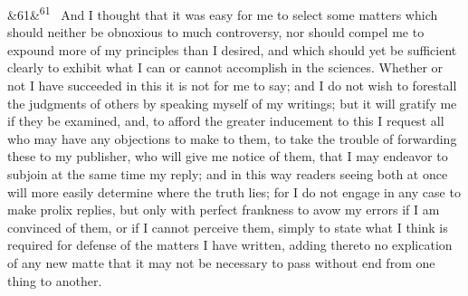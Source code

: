 \documentclass[12pt]{article}
\newcommand{\para}[1][]{\par\noindent\ifx&#1&\else\textsuperscript{\footnotesize #1}~\fi}
\begin{document}
\para[61] And I thought that it was easy for me to select some matters which should neither be obnoxious to much controversy, nor should compel me to expound more of my principles than I desired, and which should yet be sufficient clearly to exhibit what I can or cannot accomplish in the sciences. Whether or not I have succeeded in this it is not for me to say; and I do not wish to forestall the judgments of others by speaking myself of my writings; but it will gratify me if they be examined, and, to afford the greater inducement to this I request all who may have any objections to make to them, to take the trouble of forwarding these to my publisher, who will give me notice of them, that I may endeavor to subjoin at the same time my reply; and in this way readers seeing both at once will more easily determine where the truth lies; for I do not engage in any case to make prolix replies, but only with perfect frankness to avow my errors if I am convinced of them, or if I cannot perceive them, simply to state what I think is required for defense of the matters I have written, adding thereto no explication of any new matte that it may not be necessary to pass without end from one thing to another.
\end{document}
